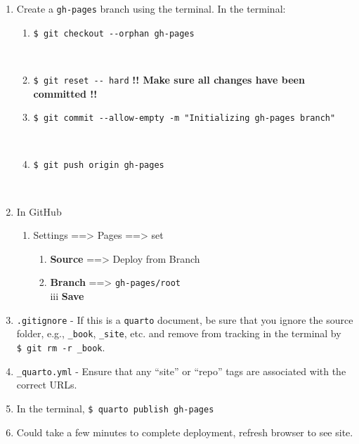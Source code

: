 \documentclass[
  letterpaper,
  DIV=11,
  numbers=noendperiod]{scrreprt}
\providecommand{\tightlist}{%
  \setlength{\itemsep}{0pt}\setlength{\parskip}{0pt}}\usepackage{longtable,booktabs,array}
\begin{document}
\begin{enumerate}
\def\labelenumi{\arabic{enumi}.}
\tightlist
\item
  Create a \texttt{gh-pages} branch using the terminal. In the terminal:

  \begin{enumerate}
  \def\labelenumii{\alph{enumii}.}
  \tightlist
  \item
    \texttt{\$\ git\ checkout\ -\/-orphan\ gh-pages}\strut \\
  \item
    \texttt{\$\ git\ reset\ -\/-\ hard} \textbf{!! Make sure all changes
    have been committed !!}\\
  \item
    \texttt{\$\ git\ commit\ -\/-allow-empty\ -m\ "Initializing\ gh-pages\ branch"}\strut \\
  \item
    \texttt{\$\ git\ push\ origin\ gh-pages}\strut \\
  \end{enumerate}
\item
  In GitHub

  \begin{enumerate}
  \def\labelenumii{\alph{enumii}.}
  \tightlist
  \item
    Settings ==\textgreater{} Pages ==\textgreater{} set

    \begin{enumerate}
    \def\labelenumiii{\roman{enumiii}.}
    \tightlist
    \item
      \textbf{Source} ==\textgreater{} Deploy from Branch\\
    \item
      \textbf{Branch} ==\textgreater{} \texttt{gh-pages/root}\\
      iii \textbf{Save}\\
    \end{enumerate}
  \end{enumerate}
\item
  \texttt{.gitignore} - If this is a \texttt{quarto} document, be sure
  that you ignore the source folder, e.g., \texttt{\_book},
  \texttt{\_site}, etc. and remove from tracking in the terminal by
  \texttt{\$\ git\ rm\ -r\ \_book}.\\
\item
  \texttt{\_quarto.yml} - Ensure that any ``site'' or ``repo'' tags are
  associated with the correct URLs.\\
\item
  In the terminal, \texttt{\$\ quarto\ publish\ gh-pages}\\
\item
  Could take a few minutes to complete deployment, refresh browser to
  see site.
\end{enumerate}
\end{document}
